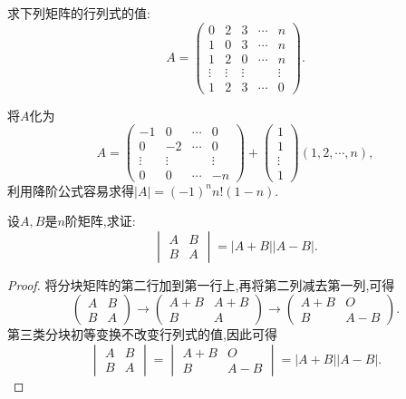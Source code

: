 \documentclass[lang=cn,newtx,10pt,scheme=chinese]{elegantbook}
\begin{document}
\begin{example}
求下列矩阵的行列式的值:
\[
A = 
\begin{pmatrix}
0 & 2 & 3 & \cdots & n\\
1 & 0 & 3 & \cdots & n\\
1 & 2 & 0 & \cdots & n\\
\vdots & \vdots & \vdots & & \vdots\\
1 & 2 & 3 & \cdots & 0
\end{pmatrix}.
\]
\end{example}
\begin{solution}
    将\(A\)化为
\[
A = 
\begin{pmatrix}
-1 & 0 & \cdots & 0\\
0 & -2 & \cdots & 0\\
\vdots & \vdots & & \vdots\\
0 & 0 & \cdots & -n
\end{pmatrix}
+
\begin{pmatrix}
1\\
1\\
\vdots\\
1
\end{pmatrix}
(1,2,\cdots,n),
\]
利用降阶公式容易求得\(|A| = (-1)^nn!(1 - n)\).
\end{solution}

\begin{proposition}\label{proposition:对角相同分块矩阵行列式计算}
设\(A,B\)是\(n\)阶矩阵,求证:
\[
\begin{vmatrix}
A & B\\
B & A
\end{vmatrix}=|A + B||A - B|.
\]
\end{proposition}
\begin{proof}
    将分块矩阵的第二行加到第一行上,再将第二列减去第一列,可得
\[
\begin{pmatrix}
A & B\\
B & A
\end{pmatrix}\to\begin{pmatrix}
A + B & A + B\\
B & A
\end{pmatrix}\to\begin{pmatrix}
A + B & O\\
B & A - B
\end{pmatrix}.
\]
第三类分块初等变换不改变行列式的值,因此可得
\[
\begin{vmatrix}
A & B\\
B & A
\end{vmatrix}=\begin{vmatrix}
A + B & O\\
B & A - B
\end{vmatrix}=|A + B||A - B|.
\]
\end{proof}
\end{document}
